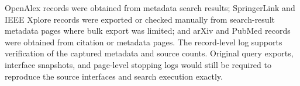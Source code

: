 OpenAlex records were obtained from metadata search results; SpringerLink and IEEE Xplore records were exported or checked manually from search-result metadata pages where bulk export was limited; and arXiv and PubMed records were obtained from citation or metadata pages. The record-level log supports verification of the captured metadata and source counts. Original query exports, interface snapshots, and page-level stopping logs would still be required to reproduce the source interfaces and search execution exactly.